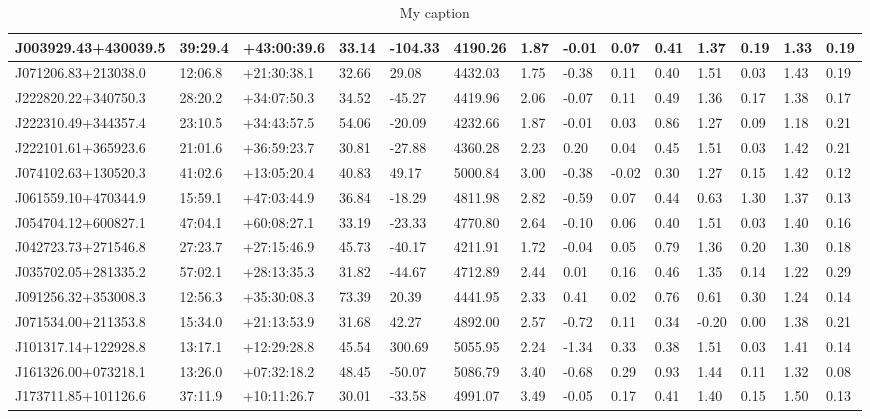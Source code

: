 \documentclass[a4paper,fleqn,usenatbib]{mnras}
\begin{document}
\begin{table}
{\begin{tabular}{@{}llllllllllllll@{}}
			J003929.43+430039.5 & 39:29.4 & +43:00:39.6 & 33.14 & -104.33 & 4190.26 & 1.87 & -0.01 & 0.07 & 0.41 & 1.37 & 0.19 & 1.33 & 0.19 \\ \midrule
			J071206.83+213038.0 & 12:06.8 & +21:30:38.1 & 32.66 & 29.08 & 4432.03 & 1.75 & -0.38 & 0.11 & 0.40 & 1.51 & 0.03 & 1.43 & 0.19 \\ \midrule
			J222820.22+340750.3 & 28:20.2 & +34:07:50.3 & 34.52 & -45.27 & 4419.96 & 2.06 & -0.07 & 0.11 & 0.49 & 1.36 & 0.17 & 1.38 & 0.17 \\ \midrule
			J222310.49+344357.4 & 23:10.5 & +34:43:57.5 & 54.06 & -20.09 & 4232.66 & 1.87 & -0.01 & 0.03 & 0.86 & 1.27 & 0.09 & 1.18 & 0.21 \\ \midrule
			J222101.61+365923.6 & 21:01.6 & +36:59:23.7 & 30.81 & -27.88 & 4360.28 & 2.23 & 0.20 & 0.04 & 0.45 & 1.51 & 0.03 & 1.42 & 0.21 \\ \midrule
			J074102.63+130520.3 & 41:02.6 & +13:05:20.4 & 40.83 & 49.17 & 5000.84 & 3.00 & -0.38 & -0.02 & 0.30 & 1.27 & 0.15 & 1.42 & 0.12 \\ \midrule
			J061559.10+470344.9 & 15:59.1 & +47:03:44.9 & 36.84 & -18.29 & 4811.98 & 2.82 & -0.59 & 0.07 & 0.44 & 0.63 & 1.30 & 1.37 & 0.13 \\ \midrule
			J054704.12+600827.1 & 47:04.1 & +60:08:27.1 & 33.19 & -23.33 & 4770.80 & 2.64 & -0.10 & 0.06 & 0.40 & 1.51 & 0.03 & 1.40 & 0.16 \\ \midrule
			J042723.73+271546.8 & 27:23.7 & +27:15:46.9 & 45.73 & -40.17 & 4211.91 & 1.72 & -0.04 & 0.05 & 0.79 & 1.36 & 0.20 & 1.30 & 0.18 \\ \midrule
			J035702.05+281335.2 & 57:02.1 & +28:13:35.3 & 31.82 & -44.67 & 4712.89 & 2.44 & 0.01 & 0.16 & 0.46 & 1.35 & 0.14 & 1.22 & 0.29 \\ \midrule
			J091256.32+353008.3 & 12:56.3 & +35:30:08.3 & 73.39 & 20.39 & 4441.95 & 2.33 & 0.41 & 0.02 & 0.76 & 0.61 & 0.30 & 1.24 & 0.14 \\ \midrule
			J071534.00+211353.8 & 15:34.0 & +21:13:53.9 & 31.68 & 42.27 & 4892.00 & 2.57 & -0.72 & 0.11 & 0.34 & -0.20 & 0.00 & 1.38 & 0.21 \\ \midrule
			J101317.14+122928.8 & 13:17.1 & +12:29:28.8 & 45.54 & 300.69 & 5055.95 & 2.24 & -1.34 & 0.33 & 0.38 & 1.51 & 0.03 & 1.41 & 0.14 \\ \midrule
			J161326.00+073218.1 & 13:26.0 & +07:32:18.2 & 48.45 & -50.07 & 5086.79 & 3.40 & -0.68 & 0.29 & 0.93 & 1.44 & 0.11 & 1.32 & 0.08 \\ \midrule
			J173711.85+101126.6 & 37:11.9 & +10:11:26.7 & 30.01 & -33.58 & 4991.07 & 3.49 & -0.05 & 0.17 & 0.41 & 1.40 & 0.15 & 1.50 & 0.13 \\ \bottomrule
		\end{tabular}%
	}
	\caption{My caption}
	\label{my-label}
\end{table}

\label{lastpage}
\end{document}
